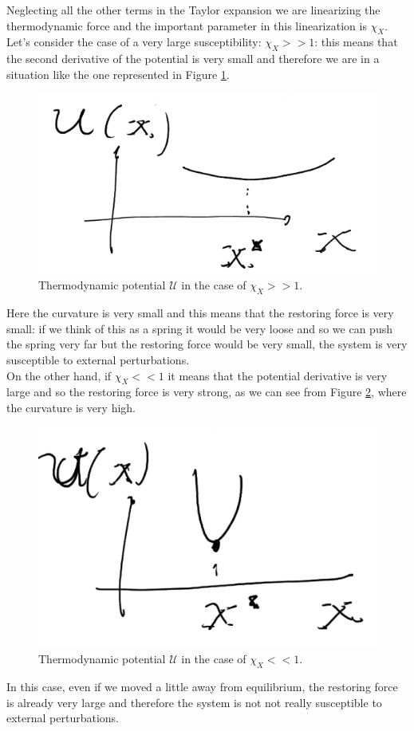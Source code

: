 \documentclass[\main/main.tex]{subfiles}
\begin{document}
Neglecting all the other terms in the Taylor expansion we are linearizing the thermodynamic force and the important parameter in this linearization is $\chi_X$. \\

Let's consider the case of a very large susceptibility: $\chi_X>>1$: this means that the second derivative of the potential is very small and therefore we are in a situation like the one represented in Figure \ref{fig:aa}.

\begin{figure}[ht]
    \centering
    \includegraphics[width=0.5\linewidth]{Lectures/Images/Immagine1.png}
    \caption{Thermodynamic potential $\mathcal{U}$ in the case of $\chi_X>>1$.}
    \label{fig:aa}
\end{figure}

Here the curvature is very small and this means that the restoring force is very small: if we think of this as a spring it would be very loose and so we can push the spring very far but the restoring force would be very small, the system is very susceptible to external perturbations. \\

On the other hand, if $\chi_X<<1$ it means that the potential derivative is very large and so the restoring force is very strong, as we can see from Figure \ref{fig:bb}, where the curvature is very high.

\begin{figure}[ht]
    \centering
    \includegraphics[width=0.5\linewidth]{Lectures/Images/imm2.png}
    \caption{Thermodynamic potential $\mathcal{U}$ in the case of $\chi_X<<1$.}
    \label{fig:bb}
\end{figure}
In this case, even if we moved a little away from equilibrium, the restoring force is already very large and therefore the system is not not really susceptible to external perturbations.
\end{document}
